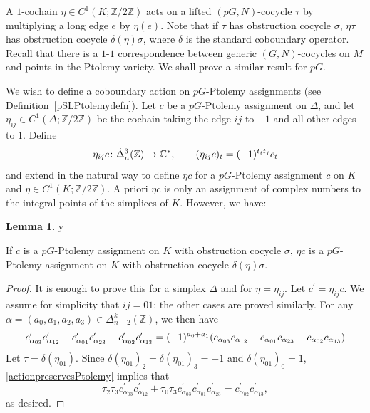 \documentclass[11pt]{amsart}
\theoremstyle{definition}
\newtheorem{lemma}[theorem]{Lemma}
\numberwithin{equation}{section}
\def\printname#1{
        \if\draft y
                \smash{\makebox[0pt]{\hspace{-0.5in}
                        \raisebox{8pt}{\tt\tiny #1}}}
        \fi
}
\def\lbl#1{\label{#1}\printname{#1}}
\newcommand{\C}{\mathbb C}
\newcommand{\Z}{\mathbb Z}
\begin{document}
A $1$-cochain $\eta\in C^1(K;\Z/2\Z)$ acts on a lifted $(pG,N)$-cocycle $\tau$ by multiplying a long edge $e$ by $\eta(e)$. Note that if $\tau$ has obstruction cocycle $\sigma$, $\eta\tau$ has obstruction cocycle $\delta(\eta)\sigma$, where $\delta$ is the standard coboundary operator.
Recall that there is a $1$-$1$ correspondence between generic $(G,N)$-cocycles on $M$ and points in the Ptolemy-variety.
We shall prove a similar result for $pG$.


We wish to define a coboundary action on $pG$-Ptolemy assignments (see Definition~\ref{pSLPtolemydefn}). Let $c$ be a $pG$-Ptolemy assignment on $\Delta$, and let $\eta_{ij}\in C^1(\Delta;\Z/2\Z)$ be the cochain taking the edge $ij$ to $-1$ and all other edges to $1$. Define
\begin{equation}\lbl{actiononPtolemys}
\eta_{ij} c\colon\dot\Delta^3_n(\Z)\to \C^*,\qquad (\eta_{ij}c)_t=(-1)^{t_it_j}c_t
\end{equation} 
and extend in the natural way to define $\eta c$ for a $pG$-Ptolemy assignment $c$ on $K$ and $\eta\in C^1(K;\Z/2\Z)$. A priori $\eta c$ is only an assignment of complex numbers to the integral points of the simplices of $K$. However, we have:
 
\begin{lemma}
\lbl{boundaryactiononPtolemy} 
If $c$ is a $pG$-Ptolemy assignment on $K$ with obstruction cocycle $\sigma$, $\eta c$ is a $pG$-Ptolemy assignment on $K$ with obstruction cocycle $\delta(\eta)\sigma$.
\end{lemma}

\begin{proof}
It is enough to prove this for a simplex $\Delta$ and for $\eta=\eta_{ij}$. Let $c^\prime=\eta_{ij}c$. We assume for simplicity that $ij=01$; the other cases are proved similarly. For any $\alpha=(a_0,a_1,a_2,a_3)\in \Delta^k_{n-2}(\Z)$, we then have
\begin{equation}\lbl{actionpreservesPtolemy}
c^\prime_{\alpha_{03}}c^\prime_{\alpha_{12}}+c^\prime_{\alpha_{01}}c^\prime_{\alpha_{23}}-c^\prime_{\alpha_{02}}c^\prime_{\alpha_{13}}=
(-1)^{a_0+a_1}(c_{\alpha_{03}}c_{\alpha_{12}}-c_{\alpha_{01}}c_{\alpha_{23}}-c_{\alpha_{02}}c_{\alpha_{13}})
\end{equation}
Let $\tau=\delta(\eta_{01})$. Since $\delta(\eta_{01})_2=\delta(\eta_{01})_3=-1$ and $\delta(\eta_{01})_0=1$, \eqref{actionpreservesPtolemy} implies that
\begin{equation}
\tau_2\tau_3c^\prime_{\alpha_{03}}c^\prime_{\alpha_{12}}+\tau_0\tau_3c^\prime_{\alpha_{03}}c^\prime_{\alpha_{01}}c^\prime_{\alpha_{23}}=c^\prime_{\alpha_{02}}c^\prime_{\alpha_{13}},
\end{equation}
as desired.
\end{proof}
\end{document}
